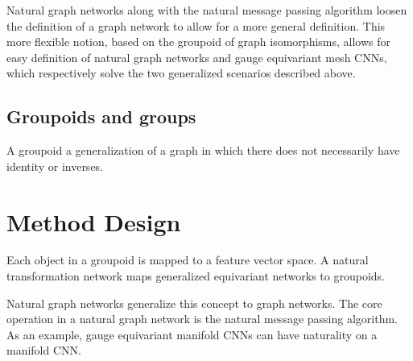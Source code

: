 \documentclass[book.tex]{subfiles}
\begin{document}
Natural graph networks along with the natural message passing algorithm loosen the definition of a graph network to allow for a more general definition. This more flexible notion, based on the groupoid of graph isomorphisms, allows for easy definition of natural graph networks and gauge equivariant mesh CNNs, which respectively solve the two generalized scenarios described above.

\subsection{Groupoids and groups}

A groupoid a generalization of a graph in which there does not necessarily have identity or inverses.






\section{Method Design}
Each object in a groupoid is mapped to a feature vector space. A natural transformation network maps generalized equivariant networks to groupoids. %

Natural graph networks generalize this concept to graph networks. The core operation in a natural graph network is the natural message passing algorithm. As an example, gauge equivariant manifold CNNs can have naturality on a manifold CNN.

\end{document}
